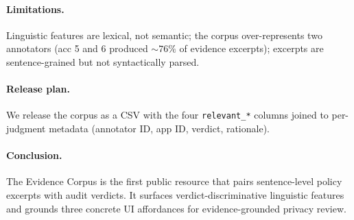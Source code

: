 \documentclass[11pt,a4paper]{article}
\begin{document}
\paragraph{Limitations.} Linguistic features are lexical, not semantic;
the corpus over-represents two annotators (acc 5 and 6 produced
$\sim 76\%$ of evidence excerpts); excerpts are sentence-grained but
not syntactically parsed.
\paragraph{Release plan.} We release the corpus as a CSV with the four
\texttt{relevant\_*} columns joined to per-judgment metadata
(annotator ID, app ID, verdict, rationale).
\paragraph{Conclusion.}
The Evidence Corpus is the first public resource that pairs
sentence-level policy excerpts with audit verdicts. It surfaces
verdict-discriminative linguistic features and grounds three concrete
UI affordances for evidence-grounded privacy review.


\end{document}
